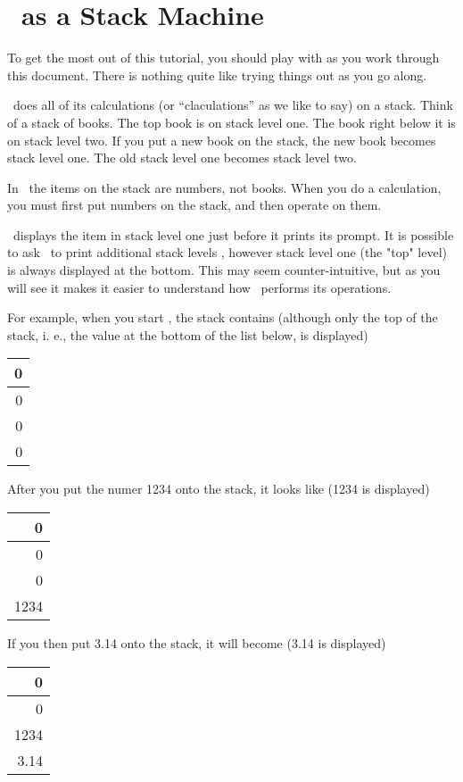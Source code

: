 
\chapter{\CLAC\ as a Stack Machine}

To get the most out of this tutorial, you should play with \CLAC as you work through this
document. There is nothing quite like trying things out as you go along.

\CLAC\ does all of its calculations (or ``claculations'' as we like to say) on a stack. Think of
a stack of books. The top book is on stack level one. The book right below it is on stack level
two. If you put a new book on the stack, the new book becomes stack level one. The old stack
level one becomes stack level two.

In \CLAC\ the items on the stack are numbers, not books. When you do a calculation, you must
first put numbers on the stack, and then operate on them.

\CLAC\ displays the item in stack level one just before it prints its prompt. It is possible to
ask \CLAC\ to print additional stack levels , however stack level
one (the "top" level) is always displayed at the bottom. This may seem counter-intuitive, but as
you will see it makes it easier to understand how \CLAC\ performs its operations.

For example, when you start \CLAC, the stack contains (although only the top of the stack, i.
e., the value at the bottom of the list below, is displayed)

\begin{tabular}{|r|} \hline
 0 \\ \hline
 0 \\ \hline
 0 \\ \hline
 0 \\ \hline
\end{tabular}

After you put the numer 1234 onto the stack, it looks like (1234 is displayed)

\begin{tabular}{|r|} \hline
    0 \\ \hline
    0 \\ \hline
    0 \\ \hline
 1234 \\ \hline
\end{tabular}

If you then put 3.14 onto the stack, it will become (3.14 is displayed)

\begin{tabular}{|r|} \hline
    0 \\ \hline
    0 \\ \hline
 1234 \\ \hline
 3.14 \\ \hline
\end{tabular}


